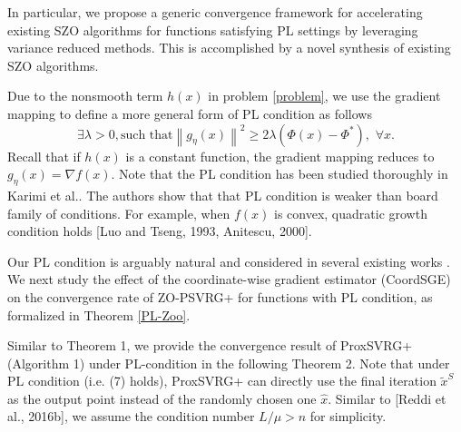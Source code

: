 \documentclass{article}
\newcommand{\norm}[1]{\left\lVert#1\right\rVert}
\theoremstyle{definition}
\theoremstyle{remark}
\begin{document}
{\color{RubineRed}
In particular, we propose a generic convergence framework for accelerating existing SZO algorithms for functions satisfying PL settings by leveraging variance reduced methods. This
is accomplished by a novel synthesis of existing SZO algorithms.
}

Due to the nonsmooth term $h(x)$ in problem \eqref{problem}, we use the gradient mapping to define a more general form of PL condition as follows
\begin{equation}
\exists \lambda >0, \text{such~that} \norm{g_{\eta}(x)}^2 \geq 2\lambda (\Phi(x) - \Phi^*),\,\, \forall x.
\end{equation}
Recall that if $h(x)$ is a constant function, the gradient mapping reduces to $g_{\eta}(x) = \nabla f(x)$.
{\color{RubineRed}
Note that the PL condition has been studied thoroughly in Karimi et al.. The authors show that that PL condition is weaker than board family of  conditions. For example, when $f(x)$ is convex,  quadratic growth condition holds [Luo and Tseng,
1993, Anitescu, 2000]. 
}

Our PL condition is arguably natural and considered in several existing works \cite{}. We next study the effect of the coordinate-wise gradient estimator (CoordSGE) on the convergence rate of ZO-PSVRG+ for functions with PL condition, as formalized in Theorem \ref{PL-Zoo}. 


{\color{Violet}
Similar to Theorem 1, we provide the convergence result of ProxSVRG+ (Algorithm 1) under PL-condition in the
following Theorem 2. Note that under PL condition (i.e. (7) holds), ProxSVRG+ can directly use the final iteration $\widetilde{x}^S$
as the output point instead of the randomly chosen
one $\hat{x}$. Similar to [Reddi et al., 2016b],
we assume the condition number $L/\mu > n$ for simplicity.
}
\end{document}
